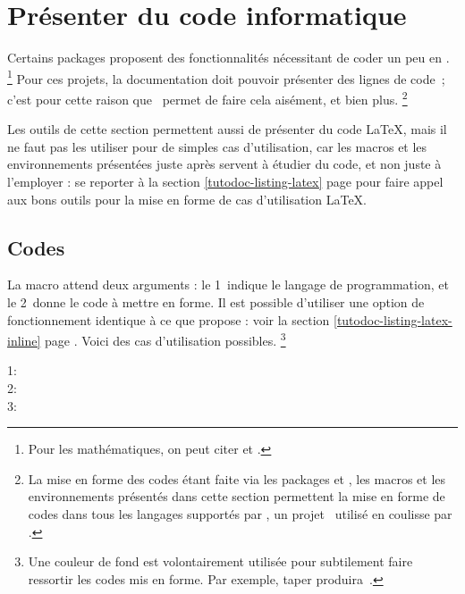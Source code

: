 \documentclass{tutodoc}
\begin{document}
\section{Présenter du code informatique}

Certains packages proposent des fonctionnalités nécessitant de coder un peu en \lua.%
\footnote{
	Pour les mathématiques, on peut citer  et .
}
Pour ces projets, la documentation doit pouvoir présenter des lignes de code \lua\,; c'est pour cette raison que \thisproj\ permet de faire cela aisément, et bien plus.%
\footnote{
    La mise en forme des codes étant faite via les packages  et , les macros et les environnements présentés dans cette section permettent la mise en forme de codes dans tous les langages supportés par \pygmentsREF, un projet \python\ utilisé en coulisse par .
}


\begin{tdocimp}
	Les outils de cette section permettent aussi de présenter du code \LaTeX, mais il ne faut pas les utiliser pour de simples cas d'utilisation, car les macros et les environnements présentées juste après servent à étudier du code, et non juste à l'employer : se reporter à la section \ref{tutodoc-listing-latex} page \pageref{tutodoc-listing-latex} pour faire appel aux bons outils pour la mise en forme de cas d'utilisation \LaTeX.
\end{tdocimp}



\subsection{Codes }

La macro  attend deux arguments : le 1\ier\ indique le langage de programmation, et le 2\ieme\ donne le code à mettre en forme.
Il est possible d'utiliser une option de fonctionnement identique à ce que propose  : voir la section \ref{tutodoc-listing-latex-inline} page \pageref{tutodoc-listing-latex-inline}.
Voici des cas d'utilisation possibles.%
\footnote{
    Une couleur de fond est volontairement utilisée pour subtilement faire ressortir les codes mis en forme.
    Par exemple, taper  produira \,.
}

\begin{tdoclatex}
1:              \\
2:  \\
3: 
\end{tdoclatex}
\end{document}

